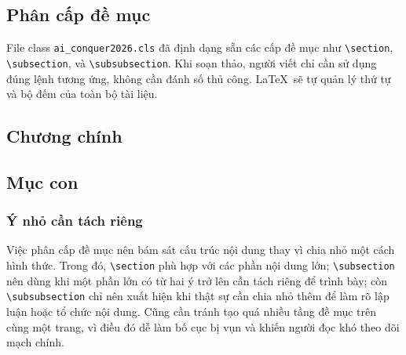 \documentclass[12pt]{ai_conquer2026}
\begin{document}
\subsection{Phân cấp đề mục}
File class \texttt{ai\_conquer2026.cls} đã định dạng sẵn các cấp đề mục như \verb|\section|, \verb|\subsection|, và \verb|\subsubsection|. Khi soạn thảo, người viết chỉ cần sử dụng đúng lệnh tương ứng, không cần đánh số thủ công. \LaTeX\ sẽ tự quản lý thứ tự và bộ đếm của toàn bộ tài liệu.

\begin{aivnoutputbox}
\section{Chương chính}
\subsection{Mục con}
\subsubsection{Ý nhỏ cần tách riêng}
\end{aivnoutputbox}

Việc phân cấp đề mục nên bám sát cấu trúc nội dung thay vì chia nhỏ một cách hình thức. Trong đó, \verb|\section| phù hợp với các phần nội dung lớn; \verb|\subsection| nên dùng khi một phần lớn có từ hai ý trở lên cần tách riêng để trình bày; còn \verb|\subsubsection| chỉ nên xuất hiện khi thật sự cần chia nhỏ thêm để làm rõ lập luận hoặc tổ chức nội dung. Cũng cần tránh tạo quá nhiều tầng đề mục trên cùng một trang, vì điều đó dễ làm bố cục bị vụn và khiến người đọc khó theo dõi mạch chính.
\end{document}
